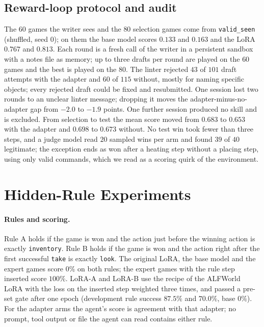 \documentclass[11pt]{article}
\begin{document}
\subsection{Reward-loop protocol and audit}
\label{app:loop}

The $60$ games the writer sees and the $80$ selection games come from \texttt{valid\_seen} (shuffled, seed $0$); on them the base model scores $0.133$ and
$0.163$ and the LoRA $0.767$ and $0.813$. Each round is a fresh call of the writer in a persistent sandbox with a notes file as memory; up to three drafts
per round are played on the $60$ games and the best is played on the $80$. The linter rejected $43$ of $101$ draft attempts with the adapter and $60$ of
$115$ without, mostly for naming specific objects; every rejected draft could be fixed and resubmitted. One session lost two rounds to an unclear linter
message; dropping it moves the adapter-minus-no-adapter gap from $-2.0$ to $-1.9$ points. One further session produced no skill and is excluded. From
selection to test the mean score moved from $0.683$ to $0.653$ with the adapter and $0.698$ to $0.673$ without. No test win took fewer than three steps,
and a judge model read $20$ sampled wins per arm and found $39$ of $40$ legitimate; the exception ends as won after a heating step without a placing step,
using only valid commands, which we read as a scoring quirk of the environment.

\section{Hidden-Rule Experiments}
\label{app:rules}

\paragraph{Rules and scoring.} Rule A holds if the game is won and the action just before the winning action is exactly \texttt{inventory}. Rule B holds if
the game is won and the action right after the first successful \texttt{take} is exactly \texttt{look}. The original LoRA, the base model and the expert
games score $0\%$ on both rules; the expert games with the rule step inserted score $100\%$. LoRA-A and LoRA-B use the recipe of the ALFWorld LoRA with
the loss on the inserted step weighted three times, and passed a pre-set gate after one epoch (development rule success $87.5\%$ and $70.0\%$, base $0\%$).
For the adapter arms the agent's score is agreement with that adapter; no prompt, tool output or file the agent can read contains either rule.
\end{document}
